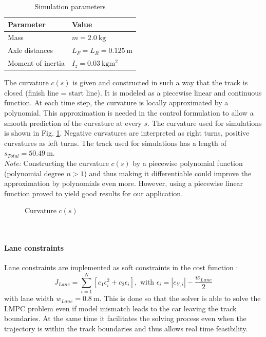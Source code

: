 \begin{table}
\centering
\caption{Simulation parameters}\label{tab:BARCPar}
\begin{tabular}{l|l}
Parameter & Value\\
\hline
Mass& $m=\SI{2.0}{\kilo\gram}$\\
Axle distances&$L_F=L_R = \SI{0.125}{\meter}$\\
Moment of inertia&$I_z = \SI{0.03}{\kilo\gram\square\meter}$
\end{tabular}
\end{table}
The curvature $c(s)$ is given and constructed in such a way that the track is closed (finish line = start line). It is modeled as a piecewise linear and continuous function. At each time step, the curvature is locally approximated by a polynomial. This approximation is needed in the control formulation to allow a smooth prediction of the curvature at every $s$. The curvature used for simulations is shown in Fig. \ref{fig:Sim_curv}. Negative curvatures are interpreted as right turns, positive curvatures as left turns. The track used for simulations has a length of $s_{Total} = \SI{50.49}{\meter}$.\\
\emph{Note:} Constructing the curvature $c(s)$ by a piecewise polynomial function (polynomial degree $n>1$) and thus making it differentiable could improve the approximation by polynomials even more. However, using a piecewise linear function proved to yield good results for our application.
\begin{figure}[ht]
	\centering
  	
  	\caption{Curvature $c(s)$}
	\label{fig:Sim_curv}
\end{figure}
\\
\paragraph{Lane constraints} Lane constraints are implemented as soft constraints in the cost function \cite[p.~114]{Borrelli2003}:
\begin{equation}\label{eq:softLaneConstraints}
J_{Lane} = \sum_{i=1}^N [c_1\epsilon_i^2 + c_2\epsilon_i], \text{ with }\epsilon_i = |e_{Y,i}|-\frac{w_{Lane}}{2}
\end{equation}
with lane width $w_{Lane}=\SI{0.8}{\meter}$. This is done so that the solver is able to solve the LMPC problem even if model mismatch leads to the car leaving the track boundaries. At the same time it facilitates the solving process even when the trajectory is within the track boundaries and thus allows real time feasibility. %
